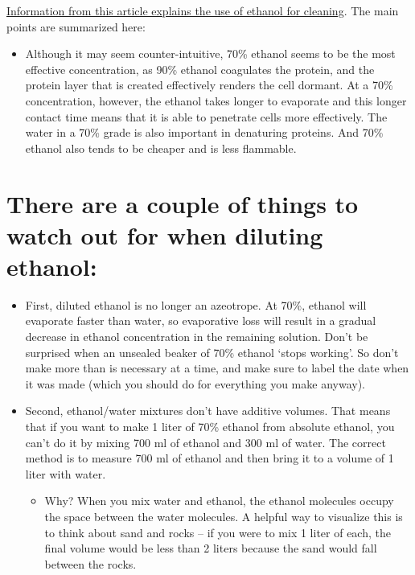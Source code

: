\documentclass[
  letterpaper,
  DIV=11,
  numbers=noendperiod]{scrreprt}
\providecommand{\tightlist}{%
  \setlength{\itemsep}{0pt}\setlength{\parskip}{0pt}}\usepackage{longtable,booktabs,array}
\begin{document}

\href{https://bitesizebio.com/13518/which-type-of-ethanol-should-i-use/}{Information
from this article explains the use of ethanol for cleaning}. The main
points are summarized here:

\begin{itemize}
\tightlist
\item
  Although it may seem counter-intuitive, 70\% ethanol seems to be the
  most effective concentration, as 90\% ethanol coagulates the protein,
  and the protein layer that is created effectively renders the cell
  dormant. At a 70\% concentration, however, the ethanol takes longer to
  evaporate and this longer contact time means that it is able to
  penetrate cells more effectively. The water in a 70\% grade is also
  important in denaturing proteins. And 70\% ethanol also tends to be
  cheaper and is less flammable.
\end{itemize}

\hypertarget{there-are-a-couple-of-things-to-watch-out-for-when-diluting-ethanol}{%
\section*{\texorpdfstring{\textbf{There are a couple of things to watch
out for when diluting
ethanol:}}{There are a couple of things to watch out for when diluting ethanol:}}\label{there-are-a-couple-of-things-to-watch-out-for-when-diluting-ethanol}}


\begin{itemize}
\item
  First, diluted ethanol is no longer an azeotrope. At 70\%, ethanol
  will evaporate faster than water, so evaporative loss will result in a
  gradual decrease in ethanol concentration in the remaining solution.
  Don't be surprised when an unsealed beaker of 70\% ethanol `stops
  working'. So don't make more than is necessary at a time, and make
  sure to label the date when it was made (which you should do for
  everything you make anyway).
\item
  Second, ethanol/water mixtures don't have additive volumes. That means
  that if you want to make 1 liter of 70\% ethanol from absolute
  ethanol, you can't do it by mixing 700 ml of ethanol and 300 ml of
  water. The correct method is to measure 700 ml of ethanol and then
  bring it to a volume of 1 liter with water.

  \begin{itemize}
  \tightlist
  \item
    Why? When you mix water and ethanol, the ethanol molecules occupy
    the space between the water molecules. A helpful way to visualize
    this is to think about sand and rocks -- if you were to mix 1 liter
    of each, the final volume would be less than 2 liters because the
    sand would fall between the rocks.
  \end{itemize}
\end{itemize}
\end{document}
